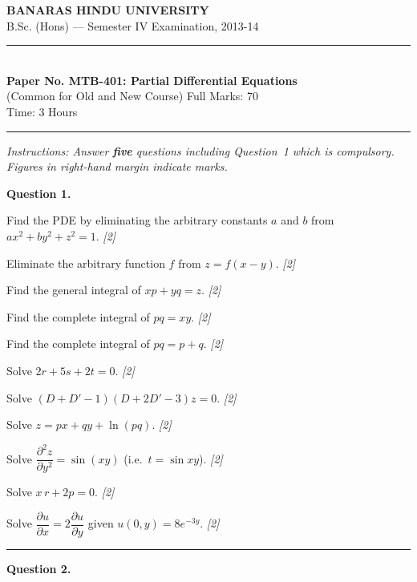 \documentclass[11pt,a4paper]{article}
\newcommand{\pts}[1]{\hfill   \textit{[#1]}}
\begin{document}
\begin{center}
  {\large\bfseries BANARAS HINDU UNIVERSITY}\\[2pt]
  {\normalsize B.Sc. (Hons) --- Semester IV Examination, 2013-14}\\[6pt]
  \rule{0.8\linewidth}{0.5pt}\\[6pt]
  {\large\bfseries Paper No. MTB-401: Partial Differential Equations}\\[4pt]
  {\normalsize (Common for Old and New Course) \hfill Full Marks: 70}\\
  {\normalsize Time: 3 Hours}
\end{center}
\rule{\linewidth}{0.4pt}
\smallskip



\noindent   \textit{Instructions: Answer   \textbf{five} questions including Question~1 which is compulsory. Figures in right-hand margin indicate marks.}
\bigskip




\noindent   \textbf{Question 1.}

\begin{parts}
  \item Find the PDE by eliminating the arbitrary constants $a$ and $b$ from $ax^2 + by^2 + z^2 = 1$. \pts{2}
  \item Eliminate the arbitrary function $f$ from $z = f(x - y)$. \pts{2}
  \item Find the general integral of $xp + yq = z$. \pts{2}
  \item Find the complete integral of $pq = xy$. \pts{2}
  \item Find the complete integral of $pq = p + q$. \pts{2}
  \item Solve $2r + 5s + 2t = 0$. \pts{2}
  \item Solve $(D + D' - 1)(D + 2D' - 3)z = 0$. \pts{2}
  \item Solve $z = px + qy + \ln(pq)$. \pts{2}
  \item Solve $\dfrac{\partial^2 z}{\partial y^2} = \sin(xy)$ (i.e.\ $t = \sin xy$). \pts{2}
  \item Solve $x\,r + 2p = 0$. \pts{2}
  \item Solve $\dfrac{\partial u}{\partial x} = 2\dfrac{\partial u}{\partial y}$ given $u(0, y) = 8e^{-3y}$. \pts{2}
\end{parts}

\medskip\rule{\linewidth}{0.2pt}

\medskip


\noindent   \textbf{Question 2.}
\end{document}
